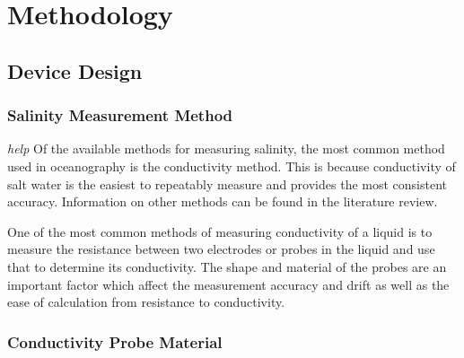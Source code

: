 
\chapter{Methodology}\label{ch:methodology}

\section{Device Design}

\subsection{Salinity Measurement Method}

\textit{help}
Of the available methods for measuring salinity, the most common method used in oceanography is the conductivity method.
This is because conductivity of salt water is the easiest to repeatably measure and provides the most consistent accuracy.
Information on other methods can be found in the literature review.

One of the most common methods of measuring conductivity of a liquid is to measure the resistance between two electrodes or probes in the liquid and use that to determine its conductivity.
The shape and material of the probes are an important factor which affect the measurement accuracy and drift as well as the ease of calculation from resistance to conductivity.

\subsection{Conductivity Probe Material}

